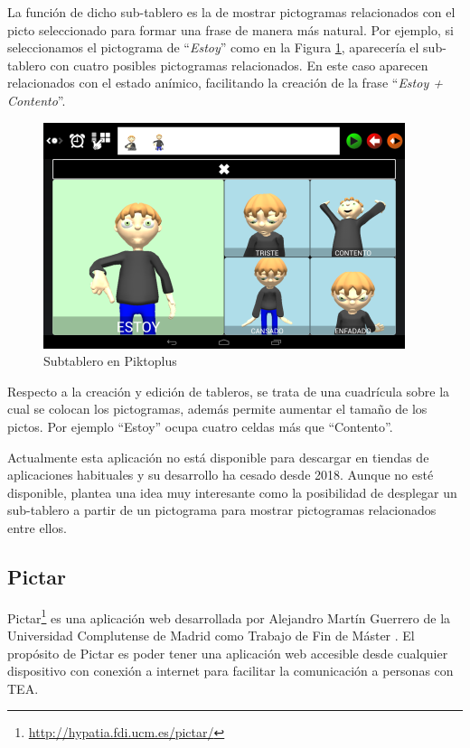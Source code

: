 La función de dicho sub-tablero es la de mostrar pictogramas relacionados con el picto seleccionado para formar una frase de manera más natural. Por ejemplo, si seleccionamos el pictograma de “\textit{Estoy}” como en la Figura  \ref{fig:piktoplus2}, aparecería el sub-tablero con cuatro posibles pictogramas relacionados. En este caso aparecen relacionados con el estado anímico, facilitando la creación de la frase “\textit{Estoy + Contento}”. 




\begin{figure}[h!]
	\centering
	\includegraphics[width=0.5\linewidth]{Imagenes/Bitmap/Piktoplus2}
	\caption[Subtablero Piktoplus]{Subtablero en Piktoplus}
	\label{fig:piktoplus2}
\end{figure}


Respecto a la creación y edición de tableros, se trata de una cuadrícula sobre la cual se colocan los pictogramas, además permite aumentar el tamaño de los pictos. Por ejemplo “Estoy” ocupa cuatro celdas más que “Contento”. 

Actualmente esta aplicación no está disponible para descargar en tiendas de aplicaciones  habituales y su desarrollo ha cesado desde 2018. Aunque no esté disponible, plantea una idea muy interesante como la posibilidad de desplegar un sub-tablero a partir de un pictograma para mostrar pictogramas relacionados entre ellos.

\subsection{Pictar}
Pictar\footnote{\url{ http://hypatia.fdi.ucm.es/pictar/}} es una aplicación web desarrollada por Alejandro Martín Guerrero de la Universidad Complutense de Madrid como Trabajo de Fin de Máster \citep{TFMPictar}. El propósito de Pictar es poder tener una aplicación web accesible desde cualquier dispositivo con conexión a internet para facilitar la comunicación a personas con TEA.

